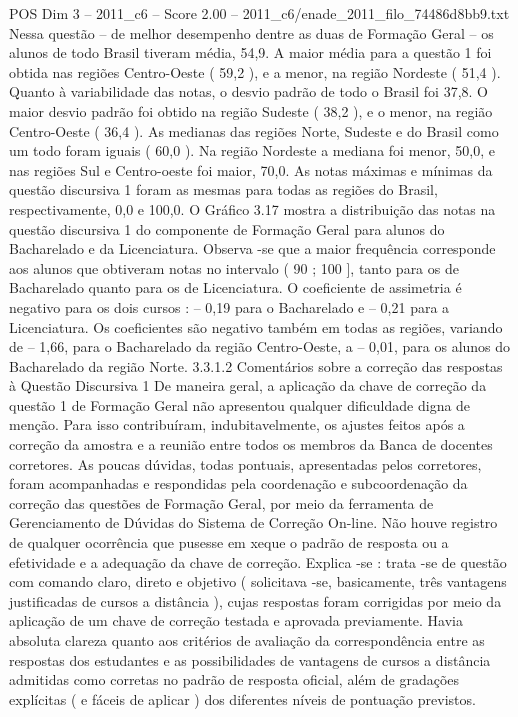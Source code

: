 \begin{textsample}{POS Dim 3 – 2011\_c6 – Score 2.00 – 2011\_c6/enade\_2011\_filo\_74486d8bb9.txt}
Nessa questão – de melhor desempenho dentre as duas de Formação Geral – os alunos de todo Brasil tiveram média, 54,9.
A maior média para a questão 1 foi obtida nas regiões Centro-Oeste ( 59,2 ), e a menor, na região Nordeste ( 51,4 ).
Quanto à variabilidade das notas, o desvio padrão de todo o Brasil foi 37,8.
O maior desvio padrão foi obtido na região Sudeste ( 38,2 ), e o menor, na região Centro-Oeste ( 36,4 ).
As medianas das regiões Norte, Sudeste e do Brasil como um todo foram iguais ( 60,0 ).
Na região Nordeste a mediana foi menor, 50,0, e nas regiões Sul e Centro-oeste foi maior, 70,0.
As notas máximas e mínimas da questão discursiva 1 foram as mesmas para todas as regiões do Brasil, respectivamente, 0,0 e 100,0.
O Gráfico 3.17 mostra a distribuição das notas na questão discursiva 1 do componente de Formação Geral para alunos do Bacharelado e da Licenciatura.
Observa -se que a maior frequência corresponde aos alunos que obtiveram notas no intervalo ( 90 ; 100 ], tanto para os de Bacharelado quanto para os de Licenciatura.
O coeficiente de assimetria é negativo para os dois cursos : – 0,19 para o Bacharelado e – 0,21 para a Licenciatura.
Os coeficientes são negativo também em todas as regiões, variando de – 1,66, para o Bacharelado da região Centro-Oeste, a – 0,01, para os alunos do Bacharelado da região Norte. 3.3.1.2 Comentários sobre a correção das respostas à Questão Discursiva 1 De maneira geral, a aplicação da chave de correção da questão 1 de Formação Geral não apresentou qualquer dificuldade digna de menção.
Para isso contribuíram, indubitavelmente, os ajustes feitos após a correção da amostra e a reunião entre todos os membros da Banca de docentes corretores.
As poucas dúvidas, todas pontuais, apresentadas pelos corretores, foram acompanhadas e respondidas pela coordenação e subcoordenação da correção das questões de Formação Geral, por meio da ferramenta de Gerenciamento de Dúvidas do Sistema de Correção On-line.
Não houve registro de qualquer ocorrência que pusesse em xeque o padrão de resposta ou a efetividade e a adequação da chave de correção.
Explica -se : trata -se de questão com comando claro, direto e objetivo ( solicitava -se, basicamente, três vantagens justificadas de cursos a distância ), cujas respostas foram corrigidas por meio da aplicação de um chave de correção testada e aprovada previamente.
Havia absoluta clareza quanto aos critérios de avaliação da correspondência entre as respostas dos estudantes e as possibilidades de vantagens de cursos a distância admitidas como corretas no padrão de resposta oficial, além de gradações explícitas ( e fáceis de aplicar ) dos diferentes níveis de pontuação previstos.

\end{textsample}
